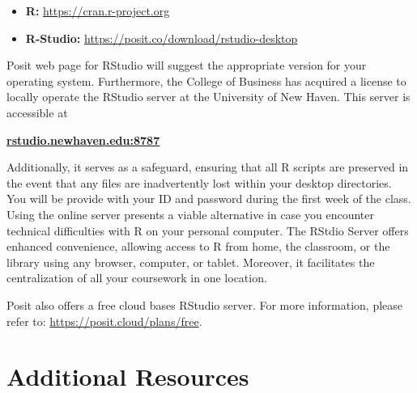 \documentclass[11pt,]{article}
\begin{document}
\begin{itemize}
\item[] \textbf{R:} \href{https://cran.r-project.org}{https://cran.r-project.org}
\item[] \textbf{R-Studio:} \href{https://posit.co/download/rstudio-desktop/}{https://posit.co/download/rstudio-desktop}
\end{itemize}

Posit web page for RStudio will suggest the appropriate version for your
operating system. Furthermore, the College of Business has acquired a
license to locally operate the RStudio server at the University of New
Haven. This server is accessible at

\begin{center}
{\bfseries \href{rstudio.newhaven.edu:8787}{rstudio.newhaven.edu:8787} }
\end{center}

Additionally, it serves as a safeguard, ensuring that all R scripts are
preserved in the event that any files are inadvertently lost within your
desktop directories. You will be provide with your ID and password
during the first week of the class. Using the online server presents a
viable alternative in case you encounter technical difficulties with R
on your personal computer. The RStdio Server offers enhanced
convenience, allowing access to R from home, the classroom, or the
library using any browser, computer, or tablet. Moreover, it facilitates
the centralization of all your coursework in one location.

Posit also offers a free cloud bases RStudio server. For more
information, please refer to: \url{https://posit.cloud/plans/free}.

\hypertarget{additional-resources}{%
\section{Additional Resources}\label{additional-resources}}
\end{document}
